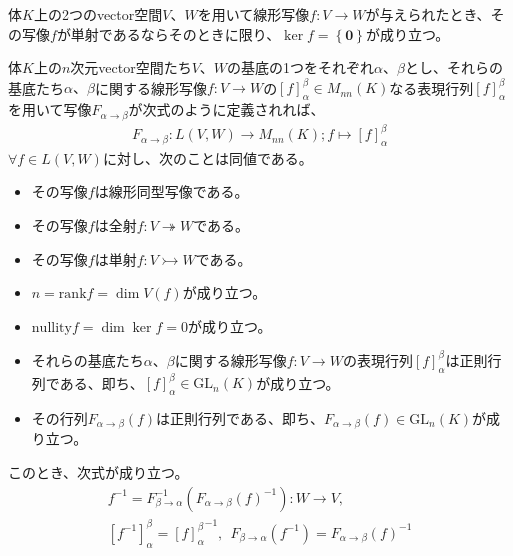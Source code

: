 \documentclass[dvipdfmx]{jsarticle}
\begin{document}
\begin{thm*}
体$K$上の2つのvector空間$V$、$W$を用いて線形写像$f:V \rightarrow W$が与えられたとき、その写像$f$が単射であるならそのときに限り、$\ker f = \left\{ \mathbf{0} \right\}$が成り立つ。
\end{thm*}
\begin{thm*}
体$K$上の$n$次元vector空間たち$V$、$W$の基底の1つをそれぞれ$\alpha$、$\beta$とし、それらの基底たち$\alpha 、\beta$に関する線形写像$f:V \rightarrow W$の$[ f]^{\beta}_{\alpha} \in M_{nn}(K)$なる表現行列$[ f]^{\beta}_{\alpha}$を用いて写像$F_{\alpha \rightarrow \beta}$が次式のように定義されれば、
\begin{align*}
F_{\alpha \rightarrow \beta}:L(V,W) \rightarrow M_{nn}(K);f \mapsto [ f]^{\beta}_{\alpha}
\end{align*}
$\forall f \in L(V,W)$に対し、次のことは同値である。
\begin{itemize}
\item
  その写像$f$は線形同型写像である。
\item
  その写像$f$は全射$f:V \twoheadrightarrow W$である。
\item
  その写像$f$は単射$f:V \rightarrowtail W$である。
\item
  $n = \mathrm{rank}f = \dim{V(f)}$が成り立つ。
\item
  $\mathrm{nullity}f = \dim{\ker f} = 0$が成り立つ。
\item
  それらの基底たち$\alpha$、$\beta$に関する線形写像$f:V \rightarrow W$の表現行列$[ f]^{\beta}_{\alpha}$は正則行列である、即ち、$[ f]^{\beta}_{\alpha} \in \mathrm{GL}_{n}(K)$が成り立つ。
\item
  その行列$F_{\alpha \rightarrow \beta}(f)$は正則行列である、即ち、$F_{\alpha \rightarrow \beta}(f) \in \mathrm{GL}_{n}(K)$が成り立つ。
\end{itemize}
このとき、次式が成り立つ。
\begin{align*}
f^{- 1} = F_{\beta \rightarrow \alpha}^{- 1}\left( {F_{\alpha \rightarrow \beta}(f)}^{- 1} \right):W \rightarrow V,\\
\left[ f^{- 1} \right]_{\alpha}^{\beta} = {[ f]^{\beta}_{\alpha}}^{- 1},\ \ F_{\beta \rightarrow \alpha}\left( f^{- 1} \right) = {F_{\alpha \rightarrow \beta}(f)}^{- 1}
\end{align*}
\end{thm*}
\end{document}
